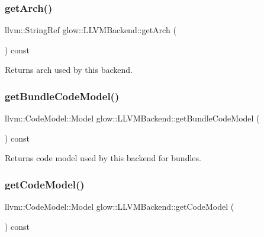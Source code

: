 \subsubsection{\texorpdfstring{get\+Arch()}{getArch()}}
{\footnotesize\ttfamily llvm\+::\+String\+Ref glow\+::\+L\+L\+V\+M\+Backend\+::get\+Arch (\begin{DoxyParamCaption}{ }\end{DoxyParamCaption}) const\hspace{0.3cm}{\ttfamily [inline]}}

\begin{DoxyReturn}{Returns}
arch used by this backend. 
\end{DoxyReturn}
\mbox{\label{classglow_1_1_l_l_v_m_backend_a0a46b08e9f98465201150b2e4715a103}} 
\subsubsection{\texorpdfstring{get\+Bundle\+Code\+Model()}{getBundleCodeModel()}}
{\footnotesize\ttfamily llvm\+::\+Code\+Model\+::\+Model glow\+::\+L\+L\+V\+M\+Backend\+::get\+Bundle\+Code\+Model (\begin{DoxyParamCaption}{ }\end{DoxyParamCaption}) const\hspace{0.3cm}{\ttfamily [inline]}}

\begin{DoxyReturn}{Returns}
code model used by this backend for bundles. 
\end{DoxyReturn}
\mbox{\label{classglow_1_1_l_l_v_m_backend_ab6a9fbd9d3dc9f01deb748cf996d4654}} 
\subsubsection{\texorpdfstring{get\+Code\+Model()}{getCodeModel()}}
{\footnotesize\ttfamily llvm\+::\+Code\+Model\+::\+Model glow\+::\+L\+L\+V\+M\+Backend\+::get\+Code\+Model (\begin{DoxyParamCaption}{ }\end{DoxyParamCaption}) const\hspace{0.3cm}{\ttfamily [inline]}}

